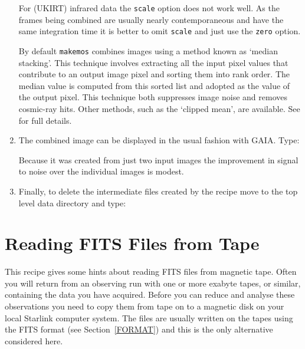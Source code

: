 \documentclass[twoside,11pt]{starlink}
\begin{document}
\begin{enumerate}
   For (UKIRT) infrared data the \texttt{scale} option does not work well.
   As the frames being combined are usually nearly contemporaneous and have
   the same integration time it is better to omit \texttt{scale} and just use
   the \texttt{zero} option.

   By default \texttt{makemos} combines images using a method known as `median
   stacking'.  This technique involves extracting all the input pixel
   values that contribute to an output image pixel and sorting them into
   rank order.  The median value is computed from this sorted list and
   adopted as the value of the output pixel.  This technique both suppresses
   image noise and removes cosmic-ray hits.  Other methods, such as the
   `clipped mean', are available.  See
   \/\cite{SUN139} for full details.

  \item The combined image can be displayed in the usual fashion with
   GAIA.  Type:

\begin{terminalv}
\end{terminalv}

   Because it was created from just two input images the improvement in
   signal to noise over the individual images is modest.

  \item Finally, to delete the intermediate files created by the recipe
   move to the top level data directory and type:

\begin{terminalv}
\end{terminalv}

\end{enumerate}


\newpage
\section{\label{READING}Reading FITS Files from Tape}

This recipe gives some hints about reading FITS files from magnetic tape.
Often you will return from an observing run with one or more exabyte
tapes, or similar, containing the data you have acquired.  Before you
can reduce and analyse these observations you need to copy them from
tape on to a magnetic disk on your local Starlink computer system.
The files are usually written on the tapes using the FITS format (see
Section~\ref{FORMAT}) and this is the only alternative considered here.
\end{document}
